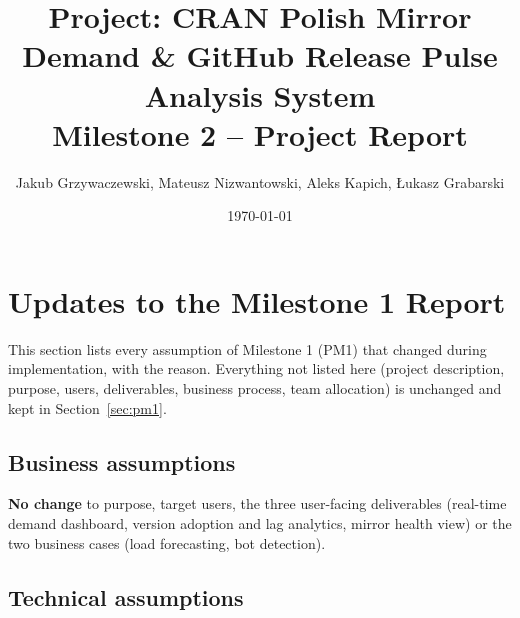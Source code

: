 \documentclass[11pt,a4paper]{article}
\title{\textbf{Project: CRAN Polish Mirror Demand \& GitHub Release Pulse Analysis System}\\[4pt]
\large Milestone 2 -- Project Report}
\author{Jakub Grzywaczewski, Mateusz Nizwantowski, Aleks Kapich, \L{}ukasz Grabarski}
\date{\today}
\begin{document}
\maketitle
\tableofcontents
\newpage

\section{Updates to the Milestone 1 Report}

This section lists every assumption of Milestone 1 (PM1) that changed during implementation, with the
reason. Everything not listed here (project description, purpose, users, deliverables, business process,
team allocation) is unchanged and kept in Section~\ref{sec:pm1}.

\subsection{Business assumptions}

\textbf{No change} to purpose, target users, the three user-facing deliverables (real-time demand
dashboard, version adoption and lag analytics, mirror health view) or the two business cases
(load forecasting, bot detection).

\subsection{Technical assumptions}
\end{document}

